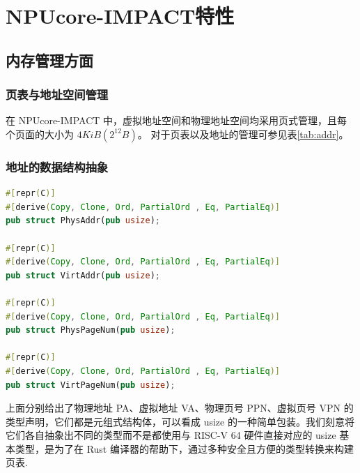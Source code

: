 

\chapter{NPUcore-IMPACT特性}
\section{内存管理方面}
\subsection{页表与地址空间管理}

\begin{table}
    \label{tab:addr}
    \centering
\caption{地址详细列表}
\end{table}

在 NPUcore-IMPACT 中，虚拟地址空间和物理地址空间均采用页式管理，且每个页面的大小为 $4KiB (2^{12}B)$。
对于页表以及地址的管理可参见表\autoref{tab:addr}。


\subsection{地址的数据结构抽象}

\begin{lstlisting}[language={rust}, label={code:refill},
        caption={存储地址数据结构}]
#[repr(C)]
#[derive(Copy, Clone, Ord, PartialOrd , Eq, PartialEq)]
pub struct PhysAddr(pub usize);

#[repr(C)]
#[derive(Copy, Clone, Ord, PartialOrd , Eq, PartialEq)]
pub struct VirtAddr(pub usize);

#[repr(C)]
#[derive(Copy, Clone, Ord, PartialOrd , Eq, PartialEq)]
pub struct PhysPageNum(pub usize);

#[repr(C)]
#[derive(Copy, Clone, Ord, PartialOrd , Eq, PartialEq)]
pub struct VirtPageNum(pub usize);
\end{lstlisting}
上面分别给出了物理地址 PA、虚拟地址 VA、物理页号 PPN、虚拟页号 VPN 的类型声明，它们都是元组式结构体，可以看成 usize 的一种简单包装。我们刻意将它们各自抽象出不同的类型而不是都使用与 RISC-V 64 硬件直接对应的 usize 基本类型，是为了在 Rust 编译器的帮助下，通过多种安全且方便的类型转换来构建页表.

